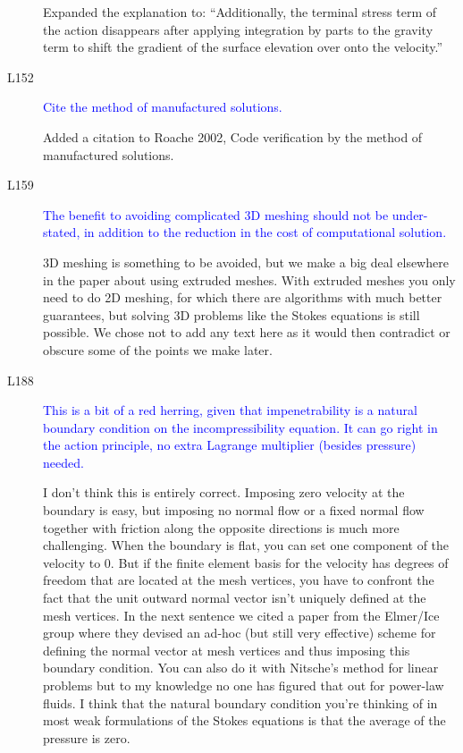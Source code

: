 \documentclass{article}
\theoremstyle{definition}
\theoremstyle{plain}
\begin{document}
\begin{description}
Expanded the explanation to: ``Additionally, the terminal stress term of the action disappears after applying integration by parts to the gravity term to shift the gradient of the surface elevation over onto the velocity.''

\item[L152] \textcolor{blue}{Cite the method of manufactured solutions.}

Added a citation to Roache 2002, Code verification by the method of manufactured solutions.

\item[L159] \textcolor{blue}{The benefit to avoiding complicated 3D meshing should not be under-
stated, in addition to the reduction in the cost of computational solution.}

3D meshing is something to be avoided, but we make a big deal elsewhere in the paper about using extruded meshes.
With extruded meshes you only need to do 2D meshing, for which there are algorithms with much better guarantees, but solving 3D problems like the Stokes equations is still possible.
We chose not to add any text here as it would then contradict or obscure some of the points we make later.

\item[L188] \textcolor{blue}{This is a bit of a red herring, given that impenetrability is a natural
boundary condition on the incompressibility equation. It can go right
in the action principle, no extra Lagrange multiplier (besides pressure)
needed.}

I don't think this is entirely correct.
Imposing zero velocity at the boundary is easy, but imposing no normal flow or a fixed normal flow together with friction along the opposite directions is much more challenging.
When the boundary is flat, you can set one component of the velocity to 0.
But if the finite element basis for the velocity has degrees of freedom that are located at the mesh vertices, you have to confront the fact that the unit outward normal vector isn't uniquely defined at the mesh vertices.
In the next sentence we cited a paper from the Elmer/Ice group where they devised an ad-hoc (but still very effective) scheme for defining the normal vector at mesh vertices and thus imposing this boundary condition.
You can also do it with Nitsche's method for linear problems but to my knowledge no one has figured that out for power-law fluids.
I think that the natural boundary condition you're thinking of in most weak formulations of the Stokes equations is that the average of the pressure is zero.


\end{description}
\end{document}
